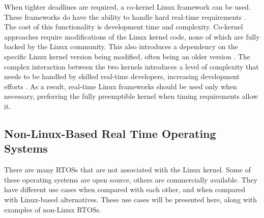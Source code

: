                 When tighter deadlines are required, a co-kernel Linux framework
                    can be used.
                These frameworks do have the ability to handle hard real-time
                    requirements \cite{preempt-rt-survey}.
                The cost of this functionality is development time and
                    complexity.
                Co-kernel approaches require modifications of the Linux kernel
                    code, none of which are fully backed by the
                    Linux community.
                This also introduces a dependency on the specific Linux kernel
                    version being modified, often being an older version
                    \cite{preempt-rt-survey}.
                The complex interaction between the two kernels introduces a
                    level of complexity that needs to be handled by skilled
                    real-time developers, increasing development efforts
                    \cite{preempt-rt-survey}.
                As a result, real-time Linux frameworks should be used only when
                    necessary, preferring the fully preemptible kernel when
                    timing requirements allow it.

        \markboth{}{}
        \subsection{Non-Linux-Based Real Time Operating Systems}
        \markboth{}{}
            There are many RTOSs that are not associated with the Linux kernel.
            Some of these operating systems are open source, others are
                commercially available.
            They have different use cases when compared with each other, and
                when compared with Linux-based alternatives.
            These use cases will be presented here, along with examples of
                non-Linux RTOSs.

